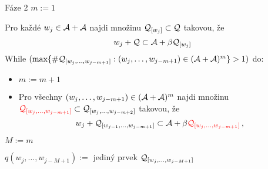 \documentclass[11pt]{beamer}
\begin{document}
\begin{frame}
    \begin{block}{Fáze 2}
      $m:=1$
      
      Pro každé $w_j \in \mathcal{A}+\mathcal{A}$ najdi množinu $\mathcal{Q}_{[w_j]} \subset \mathcal{Q}$ takovou, že
      $$
      w_j + \mathcal{Q} \subset \mathcal{A} + \beta \mathcal{Q}_{[w_j]}
      $$
    \pause
      While $(\max\{\#\mathcal{Q}_{[w_j,\dots, w_{j-m+1}]}:(w_j,\dots, w_{j-m+1}) \in (\mathcal{A}+\mathcal{A})^m \} > 1)$ do:
      \begin{itemize}
          \pause
          \item $m:= m +1$
          \pause
          \item Pro všechny $(w_j,\dots, w_{j-m+1}) \in (\mathcal{A}+\mathcal{A})^{m}$ najdi množinu $\textcolor{red}{\mathcal{Q}_{[w_j,\dots, w_{j-m+1}]}} \subset \mathcal{Q}_{[w_j,\dots, w_{j-m+2}]}$ takovou, že
          $$
          w_j + \mathcal{Q}_{[w_{j-1},\dots, w_{j-m+1}]} \subset \mathcal{A} + \beta \textcolor{red}{\mathcal{Q}_{[w_j,\dots, w_{j-m+1}]}}\,,
          $$
      \end{itemize}
      \pause
      $M:= m$ 
      
      \pause
      $q(w_j,\dots, w_{j-M+1}):=$ jediný prvek $\mathcal{Q}_{[w_j,\dots, w_{j-M+1}]}$
    \end{block}
\end{frame}
\end{document}
